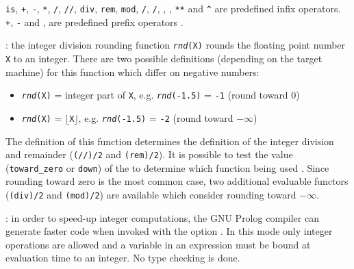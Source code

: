 \texttt{is}, \texttt{+}, \texttt{-}, \texttt{*}, \texttt{/}, \texttt{//},
\texttt{div}, \texttt{rem}, \texttt{mod}, \texttt{/{\bs}}, \texttt{{\bs}/},
\texttt{{\lt}{\lt}}, \texttt{{\gt}{\gt}}, \texttt{**} and \texttt{\^{}} are predefined infix
operators. \texttt{+}, \texttt{-} and \texttt{{\bs}}, are predefined prefix
operators .

: the integer division rounding
function \texttt{\textit{rnd}(X)} rounds the floating point number
\texttt{X} to an integer. There are two possible definitions (depending on
the target machine) for this function which differ on negative numbers:

\begin{itemize}

\item \texttt{\textit{rnd}(X)} = integer part of \texttt{X}, e.g.
\texttt{\textit{rnd}(-1.5)} = \texttt{-1} (round toward 0)

\item \texttt{\textit{rnd}(X)} = $\lfloor$\texttt{X}$\rfloor$, e.g.
\texttt{\textit{rnd}(-1.5)} = \texttt{-2} (round toward $-\infty$)

\end{itemize}

The definition of this function determines the definition of the integer
division and remainder (\texttt{(//)/2} and \texttt{(rem)/2}). It is
possible to test the value (\texttt{toward\_zero} or \texttt{down}) of the
  to determine which
function being used . Since rounding toward zero is
the most common case, two additional evaluable functors (\texttt{(div)/2} and
\texttt{(mod)/2}) are available which consider rounding toward $-\infty$.


: in order to speed-up integer computations,
the GNU Prolog compiler can generate faster code when invoked with the
 option . In this mode only
integer operations are allowed and a variable in an expression must be bound
at evaluation time to an integer. No type checking is done.

\begin{PlErrors}






\end{PlErrors}


